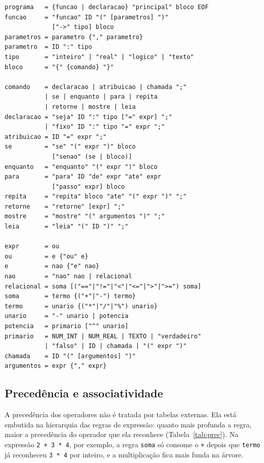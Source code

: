 \documentclass[conference]{IEEEtran}
\begin{document}
\begin{lstlisting}[style=ebnf,caption={Gramática livre de contexto da Maré (EBNF).},label=lst:ebnf]
programa   = {funcao | declaracao} "principal" bloco EOF
funcao     = "funcao" ID "(" [parametros] ")"
             ["->" tipo] bloco
parametros = parametro {"," parametro}
parametro  = ID ":" tipo
tipo       = "inteiro" | "real" | "logico" | "texto"
bloco      = "{" {comando} "}"

comando    = declaracao | atribuicao | chamada ";"
           | se | enquanto | para | repita
           | retorne | mostre | leia
declaracao = "seja" ID ":" tipo ["=" expr] ";"
           | "fixo" ID ":" tipo "=" expr ";"
atribuicao = ID "=" expr ";"
se         = "se" "(" expr ")" bloco
             ["senao" (se | bloco)]
enquanto   = "enquanto" "(" expr ")" bloco
para       = "para" ID "de" expr "ate" expr
             ["passo" expr] bloco
repita     = "repita" bloco "ate" "(" expr ")" ";"
retorne    = "retorne" [expr] ";"
mostre     = "mostre" "(" argumentos ")" ";"
leia       = "leia" "(" ID ")" ";"

expr       = ou
ou         = e {"ou" e}
e          = nao {"e" nao}
nao        = "nao" nao | relacional
relacional = soma [("=="|"!="|"<"|"<="|">"|">=") soma]
soma       = termo {("+"|"-") termo}
termo      = unario {("*"|"/"|"%") unario}
unario     = "-" unario | potencia
potencia   = primario ["^" unario]
primario   = NUM_INT | NUM_REAL | TEXTO | "verdadeiro"
           | "falso" | ID | chamada | "(" expr ")"
chamada    = ID "(" [argumentos] ")"
argumentos = expr {"," expr}
\end{lstlisting}

\subsection{Precedência e associatividade}
A precedência dos operadores não é tratada por tabelas externas. Ela está
embutida na hierarquia das regras de expressão: quanto mais profunda a regra,
maior a precedência do operador que ela reconhece (Tabela~\ref{tab:prec}). Na
expressão \texttt{2 + 3 * 4}, por exemplo, a regra \texttt{soma} só consome o
\texttt{+} depois que \texttt{termo} já reconheceu \texttt{3 * 4} por inteiro,
e a multiplicação fica mais funda na árvore.
\end{document}
